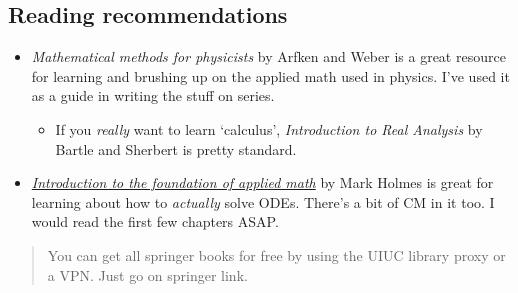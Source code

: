 \documentclass[11pt]{article}
\providecommand{\tightlist}{%
      \setlength{\itemsep}{0pt}\setlength{\parskip}{0pt}}
\begin{document}
\hypertarget{reading-recommendations}{%
\subsection{Reading recommendations}\label{reading-recommendations}}

\begin{itemize}
\item
  \emph{Mathematical methods for physicists} by Arfken and Weber is a
  great resource for learning and brushing up on the applied math used
  in physics. I've used it as a guide in writing the stuff on series.

  \begin{itemize}
  \tightlist
  \item
    If you \emph{really} want to learn `calculus', \emph{Introduction to
    Real Analysis} by Bartle and Sherbert is pretty standard.
  \end{itemize}
\item
  \emph{\href{https://link.springer.com/book/10.1007/978-0-387-87765-5}{Introduction
  to the foundation of applied math}} by Mark Holmes is great for
  learning about how to \emph{actually} solve ODEs. There's a bit of CM
  in it too. I would read the first few chapters ASAP.
\end{itemize}

\begin{quote}
You can get all springer books for free by using the UIUC library proxy
or a VPN. Just go on springer link.
\end{quote}




    
    
    
\end{document}
